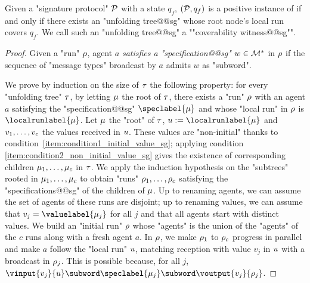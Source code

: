 \begin{lemma}
\label{lem:coverability_witness_sg}
Given a "signature protocol" $\mathcal{P}$ with a state $q_f$, $(\mathcal{P},q_f)$ is a positive instance of \COVER if and only if there exists an "unfolding tree@@sg" whose root node's local run covers $q_f$. We call such an "unfolding tree@@sg" a ""coverability witness@@sg"".
\end{lemma}
\begin{proof}
Given a "run" $\rho$, agent $a$ \emph{satisfies a "specification@@sg"} $w \in \mathcal{M}^*$ in $\rho$ if the sequence of "message types" broadcast by $a$ admits $w$ as "subword".%

We prove by induction on the size of $\tau$ the following property: for every "unfolding tree" $\tau$, by letting $\mu$ the root of $\tau$, there exists a "run" $\rho$ with an agent $a$ satisfying the "specification@@sg" $\speclabel{\node}$ and whose "local run" in $\rho$ is $\localrunlabel{\node}$. Let $\mu$ the "root" of $\tau$, $\localrun := \localrunlabel{\node}$ and $v_1, \dots, v_c$ the values received in $u$. These values are "non-initial" thanks to condition~\ref{item:condition1_initial_value_sg}; applying condition \ref{item:condition2_non_initial_value_sg} gives the existence of corresponding children $\mu_1, \dots, \mu_c$ in $\tau$. We apply the induction hypothesis on the "subtrees" rooted in $\mu_1, \dots, \mu_c$ to obtain "runs" $\rho_1, \dots, \rho_c$ satisfying the "specifications@@sg" of the children of $\mu$. Up to renaming agents, we can assume the set of agents of these runs are disjoint; up to renaming values, we can assume that $\aval_j = \valuelabel{\node_j}$ for all $j$ and that all agents start with distinct values. We build an "initial run" $\rho$ whose "agents" is the union of the "agents" of the $c$ runs along with a fresh agent $a$. In $\rho$, we make $\rho_1$ to $\rho_c$ progress in parallel and make $a$ follow the "local run" $u$, matching reception with value $v_j$ in $u$ with a broadcast in $\rho_j$. This is possible because, for all $j$, $\vinput{v_j}{\localrun} \subword \speclabel{\node_j} \subword \voutput{v_j}{\run_j}$. 


\end{proof}
